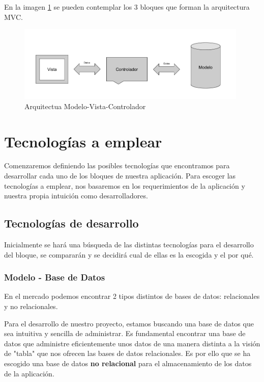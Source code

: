 En la imagen \ref{fig::mvc} se pueden contemplar los 3 bloques que forman la arquitectura MVC.

\begin{figure}
    \centerline{\includegraphics[width=11cm]{figuras/mvc.png}}
    \caption{Arquitectua Modelo-Vista-Controlador}
    \label{fig::mvc}
\end{figure}
 
\section{Tecnologías a emplear}

Comenzaremos definiendo las posibles tecnologías que encontramos para desarrollar cada uno de los bloques de nuestra aplicación. Para escoger las tecnologías a emplear, nos basaremos en los requerimientos de la aplicación y nuestra propia intuición como desarrolladores.

\subsection{Tecnologías de desarrollo}

Inicialmente se hará una búsqueda de las distintas tecnologías para el desarrollo del bloque, se compararán y se decidirá cual de ellas es la escogida y el por qué.

\subsubsection{Modelo - Base de Datos}

En el mercado podemos encontrar 2 tipos distintos de bases de datos: relacionales y no relacionales\cite{tipobd}. 

Para el desarrollo de nuestro proyecto, estamos buscando una base de datos que sea intuitiva y sencilla de administrar. Es fundamental encontrar una base de datos que administre eficientemente unos datos de una manera distinta a la visión de "tabla" que nos ofrecen las bases de datos relacionales. Es por ello que se ha escogido una base de datos \textbf{no relacional} para el almacenamiento de los datos de la aplicación.

